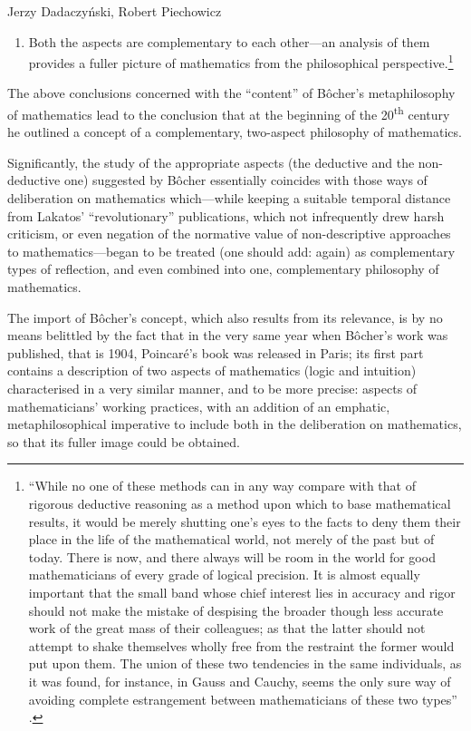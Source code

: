 \begin{artengenv}{Jerzy Dadaczyński, Robert Piechowicz}
\begin{enumerate}
{%
\parencite[][p.134]{bocher_fundamental_1904}.%
}
\item Both the aspects are complementary to each other---an analysis of them provides a fuller picture of mathematics from the philosophical perspective.\footnote{``While no one of these methods can in any way compare with that of rigorous deductive reasoning as a method upon which to base mathematical results, it would be merely shutting one's eyes to the facts to deny them their place in the life of the mathematical world, not merely of the past but of today. There is now, and there always will be room in the world for good mathematicians of every grade of logical precision. It is almost equally important that the small band whose chief interest lies in accuracy and rigor should not make the mistake of despising the broader though less accurate work of the great mass of their colleagues; as that the latter should not attempt to shake themselves wholly free from the restraint the former would put upon them. The union of these two tendencies in the same individuals, as it was found, for instance, in Gauss and Cauchy, seems the only sure way of avoiding complete estrangement between mathematicians of these two types''
\parencite[][p.135]{bocher_fundamental_1904}.%
}
\end{enumerate}
The above conclusions concerned with the ``content'' of Bôcher's metaphilosophy of mathematics lead to the conclusion that at the beginning of the 20\textsuperscript{th} century he outlined a concept of a complementary, two-aspect philosophy of mathematics.

Significantly, the study of the appropriate aspects (the deductive and the non-deductive one) suggested by Bôcher essentially coincides with those ways of deliberation on mathematics which---while keeping a suitable temporal distance from Lakatos' ``revolutionary'' publications, which not infrequently drew harsh criticism, or even negation of the normative value of non-descriptive approaches to mathematics---began to be treated (one should add: again) as complementary types of reflection, and even combined into one, complementary philosophy of mathematics.

The import of Bôcher's concept, which also results from its relevance, is by no means belittled by the fact that in the very same year when Bôcher's work was published, that is 1904, Poincaré's book
\parencite[][]{poincare_valeur_1904}
 was released in Paris; its first part contains a description of two aspects of mathematics (logic and intuition) characterised in a very similar manner, and to be more precise: aspects of mathematicians' working practices, with an addition of an emphatic, metaphilosophical imperative to include both in the deliberation on mathematics, so that its fuller image could be obtained.


\end{artengenv}
